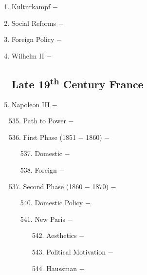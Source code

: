 \documentclass[12pt]{article}
\begin{document}
\begin{enumerate}
\item Kulturkampf $-$ 

\item Social Reforms $-$ 

\item Foreign Policy $-$ 

\item Wilhelm II $-$ 

\subsection{Late 19\textsuperscript{th} Century France}

\item Napoleon III $-$ 
\begin{enumerate}[label=\arabic{*}.]
\setcounter{enumii}{534}

\item Path to Power $-$ 

\item First Phase (1851 $-$ 1860) $-$ 

\begin{enumerate}[label=\arabic{*}.]
\setcounter{enumiii}{536}

\item Domestic $-$ 

\item Foreign $-$ 

\end{enumerate}
\setcounter{enumii}{538}

\item Second Phase (1860 $-$ 1870) $-$

\begin{enumerate}[label=\arabic{*}.]
\setcounter{enumiii}{539}

\item Domestic Policy $-$ 

\item New Paris $-$ 

\begin{enumerate}[label=\arabic{*}.]
\setcounter{enumiv}{541}

\item Aesthetics $-$ 

\item Political Motivation $-$ 

\item Haussman $-$ 

\end{enumerate}
\setcounter{enumiii}{544}


\end{enumerate}
\end{enumerate}
\end{enumerate}
\end{document}
